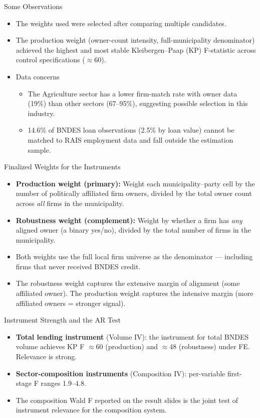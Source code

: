 \documentclass[aspectratio=169,11pt]{beamer}
\begin{document}
\begin{frame}{Some Observations}
\begin{itemize}\setlength{\itemsep}{0.35em}
\item The weights used were selected after comparing multiple candidates.
\item The production weight (owner-count intensity, full-municipality denominator) achieved the highest and most stable Kleibergen--Paap (KP) F-statistic across control specifications ($\approx$60).
\item Data concerns
  \begin{itemize}\setlength{\itemsep}{0.2em}
  \item The Agriculture sector has a lower firm-match rate with owner data (19\%) than other sectors (67--95\%), suggesting possible selection in this industry.
  \item 14.6\% of BNDES loan observations (2.5\% by loan value) cannot be matched to RAIS employment data and fall outside the estimation sample.
  \end{itemize}
\end{itemize}
\end{frame}

\begin{frame}{Finalized Weights for the Instruments}
\begin{itemize}\setlength{\itemsep}{0.35em}
\item \textbf{Production weight (primary):} Weight each municipality--party cell by the number of politically affiliated firm owners, divided by the total owner count across \textit{all} firms in the municipality.
\item \textbf{Robustness weight (complement):} Weight by whether a firm has \textit{any} aligned owner (a binary yes/no), divided by the total number of firms in the municipality.
\item Both weights use the full local firm universe as the denominator --- including firms that never received BNDES credit.
\item The robustness weight captures the extensive margin of alignment (some affiliated owner). The production weight captures the intensive margin (more affiliated owners = stronger signal).
\end{itemize}
\end{frame}

\begin{frame}{Instrument Strength and the AR Test}
\begin{itemize}\setlength{\itemsep}{0.35em}
\item \textbf{Total lending instrument} (Volume IV): the instrument for total BNDES volume achieves KP F $\approx$60 (production) and $\approx$48 (robustness) under FE. Relevance is strong.
\item \textbf{Sector-composition instruments} (Composition IV): per-variable first-stage F ranges 1.9--4.8.
\item The composition Wald F reported on the result slides is the joint test of instrument relevance for the composition system.
\end{itemize}
\end{frame}
\end{document}
